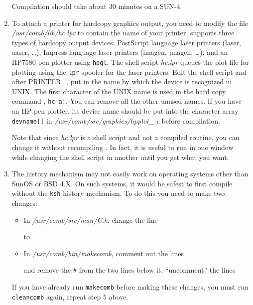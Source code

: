 \begin{enumerate}
Compilation should take about 30 minutes on a SUN-4.
  
\item To attach a printer for hardcopy graphics output, you need to modify 
the file {\sl /usr/comb/lib/hc.lpr\/} to contain the name of your printer. 
\COMB supports three types of hardcopy output devices: PostScript language
laser printers (laser, aaser, \dots), Impress language laser printers (imagen, 
jmagen, \dots), and an HP7580 pen plotter using {\tt hpgl}. The shell script
{\sl hc.lpr\/} queues the plot file for plotting using the {\tt lpr}
spooler for the laser printers.  Edit the shell script and 
after PRINTER=, put in the name by which the device is recognized in UNIX.
The first character of the UNIX name is used in the hard copy command 
\eg, {\tt hc a:}.  You can remove all the other unused names.
If you have an HP pen plotter, its device name should be put into the 
character array {\tt devname[]} in {\sl /usr/comb/src/graphics/hpplot\_.c\/} before
compilation.

Note that since {\sl hc.lpr\/} is a shell script and not a compiled routine, you
can change it without recompiling \C. In fact, it is useful to
run \COMB in one window while changing the shell script in another until
you get what you want.

\item The history mechanism may not easily work on operating systems
other than SunOS or BSD 4.X. On such systems, it would be safest to
first compile \COMB without the {\tt ksh} history mechanism. To do this
you need to make two changes:
\begin{itemize}
	\item In {\sl /usr/comb/src/man/C.h\/}, change the line 
	      to
        \item In {\sl /usr/comb/bin/makecomb\/}, comment out the lines
	and remove the {\tt \#\/} from the two lines below it, 
        \ie ``uncomment'' the lines 
\end{itemize}
\noindent
If you have already run {\tt makecomb} before making these changes, you
must run {\tt cleancomb} again, \ie repeat step 5 above.
\end{enumerate}
\newpage
